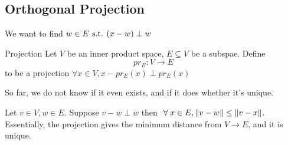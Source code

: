 \subsection{Orthogonal Projection}



We want to find \(w \in E \hspace*{4pt}\text{s.t.}\hspace*{4pt} (x - w) \perp w\)

\begin{definition} {Projection}
    Let \(V\) be an inner product space, \(E \subseteq V\) be a subspae. Define \[
        pr_E: V \to E
    \]
    to be a projection \st \(\forall x \in V, x - pr_E(x) \perp pr_E(x)\)

    So far, we do not know if it even exists, and if it does whether it's unique.
\end{definition}

\vspace{1cm}
\begin{lemma}
    Let \(v \in V, w \in E\). Suppose \(v - w \perp w\) then \(\forall x \in E, \norm{v - w} \leq \norm{v - x}\). Essentially, the projection gives the minimum distance from \(V \to E\), and it is unique.
\end{lemma}


